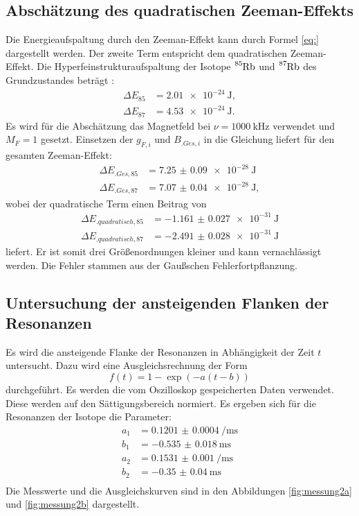 \subsection{Abschätzung des quadratischen Zeeman-Effekts}

Die Energieaufspaltung durch den Zeeman-Effekt kann durch Formel \eqref{eq:} dargestellt werden. 
Der zweite Term entspricht dem quadratischen Zeeman-Effekt. Die Hyperfeinstrukturaufspaltung der Isotope $\ce{^{85}Rb}$ und $\ce{^{87}Rb}$ des Grundzustandes beträgt \cite{V21}:
\begin{align*}
\Delta E_{85} &= \SI{2.01e-24}{\joule},\\
\Delta E_{87} &= \SI{4.53e-24}{\joule}\text{.}
\end{align*}
Es wird für die Abschätzung das Magnetfeld bei $\nu=\SI{1000}{\kilo\hertz}$ verwendet und $M_F=1$ gesetzt. Einsetzen der $g_{F,i}$ und $B_{.{Ges},i}$ in die Gleichung liefert für den gesamten Zeeman-Effekt:
\begin{align*}
\Delta E_{.{Ges},85} &= \SI{7.25(9)e-28}{\joule}\\
\Delta E_{.{Ges},87} &= \SI{7.07(4)e-28}{\joule},
\end{align*}
wobei der quadratische Term einen Beitrag von
\begin{align*}
\Delta E_{.{quadratisch},85} &= \SI{-1.161(27)e-31}{\joule}\\
\Delta E_{.{quadratisch},87} &= \SI{-2.491(28)e-31}{\joule}
\end{align*}
liefert. Er ist somit drei Größenordnungen kleiner und kann vernachlässigt werden.
Die Fehler stammen aus der Gaußschen Fehlerfortpflanzung.

\subsection{Untersuchung der ansteigenden Flanken der Resonanzen}

Es wird die ansteigende Flanke der Resonanzen in Abhängigkeit der Zeit $t$ untersucht. Dazu wird eine Ausgleichsrechnung der Form
\[
f(t)=1-\exp(-a(t-b))
\]
durchgeführt. Es werden die vom Oszilloskop gespeicherten Daten verwendet. Diese werden auf den Sättigungsbereich normiert.
Es ergeben sich für die Resonanzen der Isotope die Parameter:
\begin{align*}
a_1 &= \SI{0.1201(4)}{\per\milli\second}\\
b_1 &= \SI{-0.535(18)}{\milli\second}\\
a_2 &= \SI{0.1531(10)}{\per\milli\second}\\
b_2 &= \SI{-0.35(4)}{\milli\second}\\
\end{align*}
Die Messwerte und die Ausgleichskurven sind in den Abbildungen \ref{fig:messung2a} und \ref{fig:messung2b} dargestellt. 

